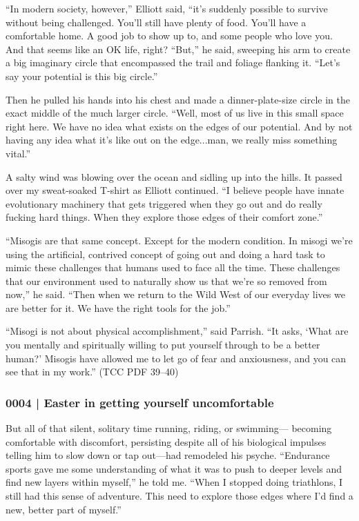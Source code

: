 			``In modern society, however,'' Elliott said, ``it's suddenly possible to survive without being challenged. You'll still have plenty of food. You'll have a comfortable home. A good job to show up to, and some people who love you. And that seems like an OK life, right? ``But,'' he said, sweeping his arm to create a big imaginary circle that encompassed the trail and foliage flanking it. ``Let's say your potential is this big circle.'' 

			Then he pulled his hands into his chest and made a dinner-plate-size circle in the exact middle of the much larger circle. ``Well, most of us live in this small space right here. We have no idea what exists on the edges of our potential. And by not having any idea what it's like out on the edge...man, we really miss something vital.'' 

			A salty wind was blowing over the ocean and sidling up into the hills. It passed over my sweat-soaked T-shirt as Elliott continued. ``I believe people have innate evolutionary machinery that gets triggered when they go out and do really fucking hard things. When they explore those edges of their comfort zone.'' 

			``Misogis are that same concept. Except for the modern condition. In misogi we're using the artificial, contrived concept of going out and doing a hard task to mimic these challenges that humans used to face all the time. These challenges that our environment used to naturally show us that we're so removed from now,'' he said. ``Then when we return to the Wild West of our everyday lives we are better for it. We have the right tools for the job.'' 

			``Misogi is not about physical accomplishment,'' said Parrish. ``It asks, `What are you mentally and spiritually willing to put yourself through to be a better human?' Misogis have allowed me to let go of fear and anxiousness, and you can see that in my work.'' (TCC PDF 39--40)
			
		\subsubsection{0004 | Easter in getting yourself uncomfortable}
			\label{GM-LIFE-GROWTH-0004}
			
			But all of that silent, solitary time running, riding, or swimming--- becoming comfortable with discomfort, persisting despite all of his biological impulses telling him to slow down or tap out---had remodeled his psyche. ``Endurance sports gave me some understanding of what it was to push to deeper levels and find new layers within myself,'' he told me. ``When I stopped doing triathlons, I still had this sense of adventure. This need to explore those edges where I'd find a new, better part of myself.'' 

